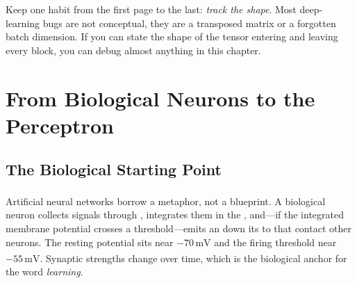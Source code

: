 \begin{engineernote}
Keep one habit from the first page to the last: \emph{track the shape}. Most
deep-learning bugs are not conceptual, they are a transposed matrix or a
forgotten batch dimension. If you can state the shape of the tensor entering
and leaving every block, you can debug almost anything in this chapter.
\end{engineernote}

\section{From Biological Neurons to the Perceptron}

\subsection{The Biological Starting Point}

Artificial neural networks borrow a metaphor, not a
blueprint\textsuperscript{\cite[][pp.~27--35]{Kriesel2007NeuralNetworks}}. A
biological neuron collects signals through , integrates them
in the , and---if the integrated membrane potential crosses a
threshold---emits an  down its  to
 that contact other neurons. The resting potential sits near
$-70\,\text{mV}$ and the firing threshold near
$-55\,\text{mV}$\textsuperscript{\cite[][pp.~29--31]{Kriesel2007NeuralNetworks}}.
Synaptic strengths change over time, which is the biological anchor for the
word \emph{learning}.

